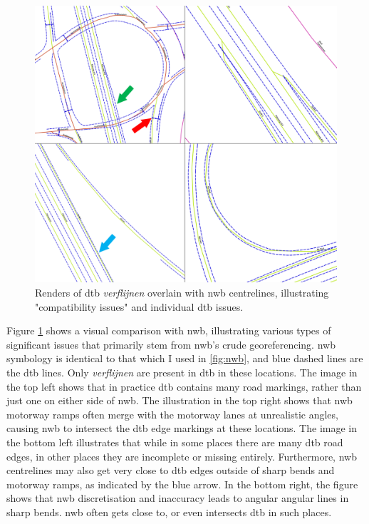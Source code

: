 \begin{figure}
    \centering
    \includegraphics[width=0.95\linewidth]{final_report/figs/dtb_sample_07.png} 
    \caption{Renders of \ac{dtb} \textit{verflijnen} overlain with \ac{nwb} centrelines, illustrating "compatibility issues" and individual \ac{dtb} issues.}
    \label{fig:dtbnwb}
\end{figure}

Figure \ref{fig:dtbnwb} shows a visual comparison with \ac{nwb}, illustrating various types of significant issues that primarily stem from \ac{nwb}'s crude georeferencing. \ac{nwb} symbology is identical to that which I used in \ref{fig:nwb}, and blue dashed lines are the \ac{dtb} lines. Only \textit{verflijnen} are present in \ac{dtb} in these locations. The image in the top left shows that in practice \ac{dtb} contains many road markings, rather than just one on either side of \ac{nwb}. The illustration in the top right shows that \ac{nwb} motorway ramps often merge with the motorway lanes at unrealistic angles, causing \ac{nwb} to intersect the \ac{dtb} edge markings at these locations. The image in the bottom left illustrates that while in some places there are many \ac{dtb} road edges, in other places they are incomplete or missing entirely. Furthermore, \ac{nwb} centrelines may also get very close to \ac{dtb} edges outside of sharp bends and motorway ramps, as indicated by the blue arrow. In the bottom right, the figure shows that \ac{nwb} discretisation and inaccuracy leads to angular angular lines in sharp bends. \ac{nwb} often gets close to, or even intersects \ac{dtb} in such places.

